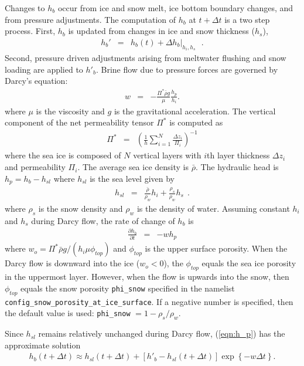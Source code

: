 Changes to $h_b$ occur from ice and snow melt, ice
bottom boundary changes,
and from  pressure adjustments. The computation of $h_b$ at $t+\Delta
t$ is a two step process. First,  $h_b$  is updated from
changes in ice and snow thickness ($h_s$), \bgcie
\begin{eqnarray}
\label{eqn:hb_thickness_changes}
h_b' & = & h_b(t) + \Delta h_b|_{h_i,h_s} \ \ \ .
\end{eqnarray}
 Second,  pressure driven adjustments arising from
meltwater flushing and snow loading are applied to $h'_b$. Brine flow due
to pressure forces are governed by
Darcy's equation:
\begin{eqnarray}
\label{eqn:Darcy}
w & = & -\frac{\Pi^* \bar{\rho} g}{\mu}\frac{h_p}{h_i}.
\end{eqnarray}
where $\mu$ is the viscosity and $g$ is the gravitational acceleration.
The vertical component of the net permeability tensor $\Pi^*$
is computed as
\begin{eqnarray}
\label{eqn:netPi}
\Pi^* & = & \left(\frac{1}{h}\sum_{i=1}^N{\frac{\Delta
      z_i}{\Pi_i}}\right)^{-1}
\end{eqnarray}
where the sea ice is composed of $N$ vertical layers with $i$th layer
thickness $\Delta z_i$ and
permeability $\Pi_i$. %
The average sea ice density is
$\bar{\rho}$.
 The hydraulic head is $h_p = h_b - h_{sl}$ where $h_{sl}$ is the sea
 level given by
\begin{eqnarray}
h_{sl} & = & \frac{\bar{\rho}}{\rho_w}h_i + \frac{\rho_s}{\rho_w}h_s \ \ .
\end{eqnarray}
where $\rho_s$ is the snow density and $\rho_w$ is the density of water.
Assuming constant $h_i$ and $h_s$ during Darcy flow, the rate of change of $h_b$ is
\begin{eqnarray}
\label{eqn:h_p}
\frac{\partial h_b}{\partial t}  & = & -w h_p
\end{eqnarray}
where   $w_o = \Pi^* \bar{\rho}
g/(h_i\mu\phi_{top})$ and $\phi_{top}$ is the upper surface porosity.
When the Darcy flow is downward into the ice ($w_o < 0$), the
$\phi_{top}$ equals the sea ice porosity in the uppermost layer.  However,
when the flow is upwards into the snow, then $\phi_{top}$ equals the snow
porosity {\tt phi\_snow} specified in the namelist {\tt config\_snow\_porosity\_at\_ice\_surface}.  If a negative
number is specified, then the default value is
used: {\tt phi\_snow} $=1 - \rho_s/\rho_w$.

Since $h_{sl}$ remains relatively unchanged during Darcy flow,
(\ref{eqn:h_p}) has the approximate solution
\begin{eqnarray}
\label{eqn:brine_height}
h_b(t+\Delta t) \approx h_{sl}(t+\Delta t) +  [h'_b - h_{sl}(t+\Delta t)]\exp\left\{-w \Delta t\right\}.
\end{eqnarray}

